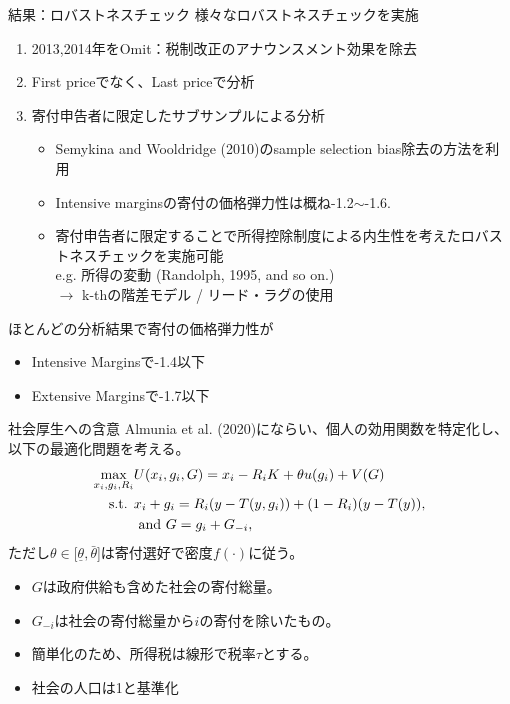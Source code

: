 \documentclass[dvipdfmx,10pt]{beamer}
\begin{document}
\begin{frame}{結果：ロバストネスチェック}
 様々なロバストネスチェックを実施
		\begin{enumerate}
			\item 2013,2014年をOmit：税制改正のアナウンスメント効果を除去
			\item First priceでなく、Last priceで分析
			\item 寄付申告者に限定したサブサンプルによる分析
			\begin{itemize}
				\item Semykina and Wooldridge (2010)のsample selection bias除去の方法を利用
				\item Intensive marginsの寄付の価格弾力性は概ね-1.2\(\sim\)-1.6.
				\item 寄付申告者に限定することで所得控除制度による内生性を考えたロバストネスチェックを実施可能\\
				e.g. 所得の変動 (Randolph, 1995, and so on.)\\
				$\to$ k-thの階差モデル / リード・ラグの使用  
			\end{itemize}
		\end{enumerate}
		ほとんどの分析結果で寄付の価格弾力性が
		\begin{itemize}
			\item Intensive Marginsで-1.4以下 
			\item Extensive Marginsで-1.7以下
		\end{itemize}
\end{frame}

\begin{frame}{社会厚生への含意}
	Almunia et al. (2020)にならい、個人の効用関数を特定化し、以下の最適化問題を考える。
	\begin{align}
		\max_{x_i,g_i,R_i}&U(x_i,g_i,G)= x_i - R_iK +\theta u(g_i) + V(G)\notag\\
		\text{s.t. }&x_i + g_i = R_i(y-T(y, g_i)) + (1-R_i)(y-T(y)),\notag\\
		&\text{ and }G=g_i+G_{-i}\notag,
	\end{align}
	ただし$\theta\in[\underline{\theta},\bar{\theta}$]は寄付選好で密度$f(\cdot)$に従う。 
	\begin{itemize}
		\item $G$は政府供給も含めた社会の寄付総量。
		\item $G_{-i}$は社会の寄付総量から$i$の寄付を除いたもの。
		\item 簡単化のため、所得税は線形で税率$\tau$とする。
		\item 社会の人口は1と基準化
	\end{itemize}
\end{frame}
\end{document}
